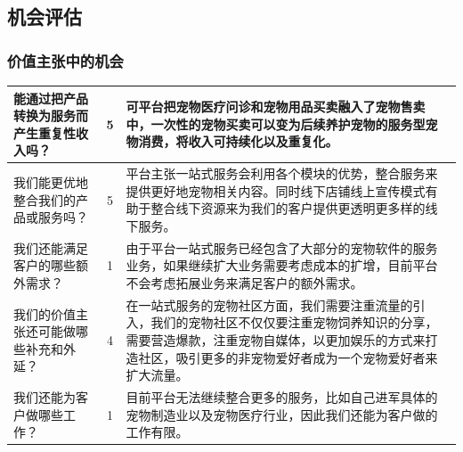 \documentclass[a4paper]{ctexart}
\begin{document}
\FloatBarrier
\subsection{机会评估}
\subsubsection{价值主张中的机会}
\begin{table}[h]
  \centering
\begin{tabular}{|p{3.5cm}|c|p{10cm}|}
  \hline
  能通过把产品转换为服务而产生重复性收入吗？ & 5 & 可平台把宠物医疗问诊和宠物用品买卖融入了宠物售卖中，一次性的宠物买卖可以变为后续养护宠物的服务型宠物消费，将收入可持续化以及重复化。\\
  \hline
  我们能更优地整合我们的产品或服务吗？ & 5 & 平台主张一站式服务会利用各个模块的优势，整合服务来提供更好地宠物相关内容。同时线下店铺线上宣传模式有助于整合线下资源来为我们的客户提供更透明更多样的线下服务。\\
  \hline
  我们还能满足客户的哪些额外需求？ & 1 & 由于平台一站式服务已经包含了大部分的宠物软件的服务业务，如果继续扩大业务需要考虑成本的扩增，目前平台不会考虑拓展业务来满足客户的额外需求。\\
  \hline
  我们的价值主张还可能做哪些补充和外延？ & 4 & 在一站式服务的宠物社区方面，我们需要注重流量的引入，我们的宠物社区不仅仅要注重宠物饲养知识的分享，需要营造爆款，注重宠物自媒体，以更加娱乐的方式来打造社区，吸引更多的非宠物爱好者成为一个宠物爱好者来扩大流量。\\
  \hline
  我们还能为客户做哪些工作？ & 1 & 目前平台无法继续整合更多的服务，比如自己进军具体的宠物制造业以及宠物医疗行业，因此我们还能为客户做的工作有限。\\
  \hline
\end{tabular}
\end{table}

\FloatBarrier
\end{document}
